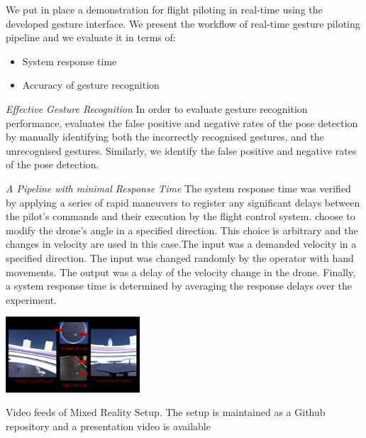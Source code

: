 We put in place a demonstration for flight piloting in real-time using the developed gesture interface. 
We present the workflow of real-time gesture piloting pipeline and we evaluate it in terms of:
\begin{itemize}
    \item System response time
    \item Accuracy of gesture recognition
\end{itemize}

\textit{Effective Gesture Recognition} \hspace {0.5cm} In order to evaluate gesture recognition performance, \cite{bolin_crawford_macke_hoffman_beckmann_sen_2017} evaluates the false positive and negative rates of the pose detection by manually identifying both the incorrectly recognised gestures, and the unrecognised gestures. Similarly, we identify the false positive and negative rates of the pose detection.%


\textit{A Pipeline with minimal Response Time} \hspace{0.5cm} The system response time was verified by applying a series of rapid maneuvers to register any significant delays between the pilot’s commands and their execution by the flight control system.  \cite{experimental_tuning} choose to modify the drone’s angle in a specified direction. This choice is arbitrary and the changes in velocity are used in this case.The input was a demanded velocity in a specified direction. The input was changed randomly by the operator with hand movements. The output was a delay of the velocity change in the drone. Finally, a system response time is determined by averaging the response delays over the experiment. %

\begin{marginfigure}%
    \raggedright
    \includegraphics[width=5cm]{images/xr_pres.png}
    \caption{Video feeds of Mixed Reality Setup. The setup is maintained as a Github repository \cite{mixedreality_github} and a presentation video is available \cite{mixedreality_video}}
\end{marginfigure}

